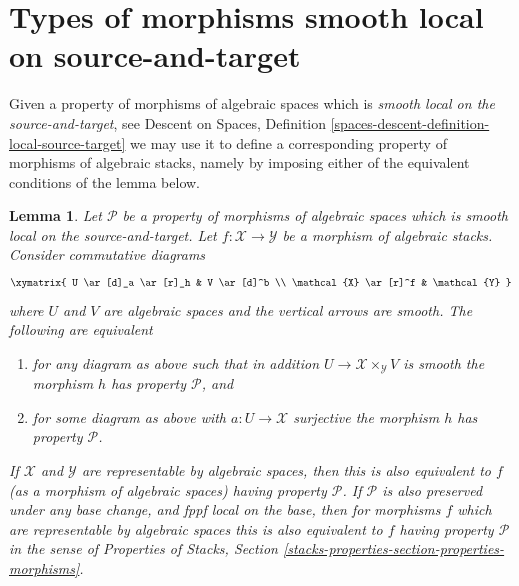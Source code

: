 \documentclass{stacks-project}
\theoremstyle{plain}
\newtheorem{lemma}[subsection]{Lemma}
\theoremstyle{definition}
\theoremstyle{remark}
\numberwithin{equation}{subsection}
\begin{document}
\section{Types of morphisms smooth local on source-and-target}
\label{section-local-source-target}

\noindent
Given a property of morphisms of algebraic spaces which is
{\it smooth local on the source-and-target}, see
Descent on Spaces,
Definition \ref{spaces-descent-definition-local-source-target}
we may use it to define a corresponding
property of morphisms of algebraic stacks, namely by imposing either of
the equivalent conditions of the lemma below.

\begin{lemma}
\label{lemma-local-source-target}
Let $\mathcal{P}$ be a property of morphisms of algebraic spaces
which is smooth local on the source-and-target.
Let $f : \mathcal{X} \to \mathcal{Y}$ be a morphism of algebraic stacks.
Consider commutative diagrams
$$
\xymatrix{
U \ar[d]_a \ar[r]_h & V \ar[d]^b \\
\mathcal{X} \ar[r]^f & \mathcal{Y}
}
$$
where $U$ and $V$ are algebraic spaces and the vertical arrows are smooth.
The following are equivalent
\begin{enumerate}
\item for any diagram as above such that in addition
$U \to \mathcal{X} \times_\mathcal{Y} V$ is smooth
the morphism $h$ has property $\mathcal{P}$, and
\item for some diagram as above with $a : U \to \mathcal{X}$ surjective
the morphism $h$ has property $\mathcal{P}$.
\end{enumerate}
If $\mathcal{X}$ and $\mathcal{Y}$ are representable by algebraic spaces,
then this is also equivalent to $f$ (as a morphism of algebraic spaces)
having property $\mathcal{P}$. If $\mathcal{P}$ is also preserved under
any base change, and fppf local on the base, then for morphisms $f$
which are representable by algebraic spaces this
is also equivalent to $f$ having property $\mathcal{P}$ in the sense
of
Properties of Stacks,
Section \ref{stacks-properties-section-properties-morphisms}.
\end{lemma}
\end{document}
